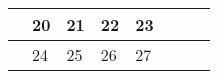 {\begin{tabularx}{\linewidth}{|l!{\vrule width \myLenLineThicknessThick}*{7}{@{}X@{}|}}
       & 
    
      
      
        \begin{minipage}[t]{6mm}\centering{}20\end{minipage}
      
       & 
    
      
      
        \begin{minipage}[t]{6mm}\centering{}21\end{minipage}
      
       & 
    
      
      
        \begin{minipage}[t]{6mm}\centering{}22\end{minipage}
      
       & 
    
      
      
        \begin{minipage}[t]{6mm}\centering{}23\end{minipage}
      
      
        \\  \hline 
      
    
  
  
  
  \hyperlink{week-2026-34}{} &
    
      
      
        \begin{minipage}[t]{6mm}\centering{}24\end{minipage}
      
       & 
    
      
      
        \begin{minipage}[t]{6mm}\centering{}25\end{minipage}
      
       & 
    
      
      
        \begin{minipage}[t]{6mm}\centering{}26\end{minipage}
      
       & 
    
      
      
        \begin{minipage}[t]{6mm}\centering{}27\end{minipage}
      

\end{tabularx}}

